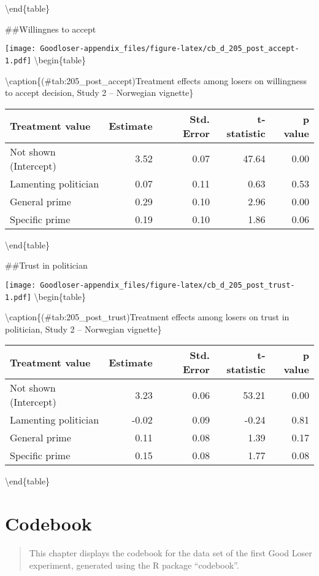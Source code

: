 \documentclass[
]{book}
\begin{document}
\textbackslash end\{table\}

\#\#Willingnes to accept

\texttt{[image: Goodloser-appendix\_files/figure-latex/cb\_d\_205\_post\_accept-1.pdf]} \textbackslash begin\{table\}

\textbackslash caption\{(\#tab:205\_post\_accept)Treatment effects among losers on willingness to accept decision, Study 2 -- Norwegian vignette\}
\centering

\begin{tabular}[t]{lrrrr}
\toprule
Treatment value & Estimate & Std. Error & t-statistic & p value\\
\midrule
Not shown (Intercept) & 3.52 & 0.07 & 47.64 & 0.00\\
Lamenting politician & 0.07 & 0.11 & 0.63 & 0.53\\
General prime & 0.29 & 0.10 & 2.96 & 0.00\\
Specific prime & 0.19 & 0.10 & 1.86 & 0.06\\
\bottomrule
\end{tabular}

\textbackslash end\{table\}

\#\#Trust in politician

\texttt{[image: Goodloser-appendix\_files/figure-latex/cb\_d\_205\_post\_trust-1.pdf]} \textbackslash begin\{table\}

\textbackslash caption\{(\#tab:205\_post\_trust)Treatment effects among losers on trust in politician, Study 2 -- Norwegian vignette\}
\centering

\begin{tabular}[t]{lrrrr}
\toprule
Treatment value & Estimate & Std. Error & t-statistic & p value\\
\midrule
Not shown (Intercept) & 3.23 & 0.06 & 53.21 & 0.00\\
Lamenting politician & -0.02 & 0.09 & -0.24 & 0.81\\
General prime & 0.11 & 0.08 & 1.39 & 0.17\\
Specific prime & 0.15 & 0.08 & 1.77 & 0.08\\
\bottomrule
\end{tabular}

\textbackslash end\{table\}

\hypertarget{codebook-1}{%
\chapter{Codebook}\label{codebook-1}}

\begin{quote}
This chapter displays the codebook for the data set of the first Good Loser experiment, generated using the R package ``codebook''.
\end{quote}
\end{document}
